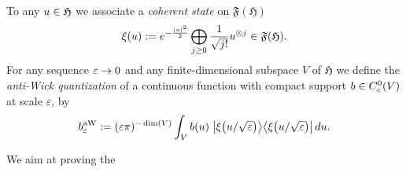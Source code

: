 \documentclass[AHL,Unicode,longabstracts,published]{cedram}
\newcommand{\gH}{\mathfrak{H}}
\newcommand{\gF}{\mathfrak{F}}
\newcommand{\1}{\mathds{1}}
\newcommand{\eps}{\varepsilon}
\let\oldin\in
\renewcommand{\in}{\mathchoice{\oldin}{\oldin}{\,\oldin\,}{\,\oldin\,}}
\renewcommand*{\to}{\mathchoice{\longrightarrow}{\rightarrow}{\rightarrow}{\rightarrow}}
\let\originalleft\left
\let\originalright\right
\renewcommand{\left}{\mathopen{}\mathclose\bgroup\originalleft}
\renewcommand{\right}{\aftergroup\egroup\originalright}
\begin{document}
\begin{defi}\label{def:a-Wick}
To any $u\in \gH$ we associate a \emph{coherent state} on $\gF(\gH)$
\begin{equation}
\xi(u):=e^{-\frac{|u|^2}{2}} \bigoplus_{j \ge 0} \frac{1}{\sqrt{j!}} u^{\otimes j}\in\gF(\gH).\label{eq:def_coherent}
\end{equation}
For any sequence $\eps\to0$ and any finite-dimensional subspace $V$ of $\gH$ we define the \emph{anti-Wick quantization} of a continuous function with compact support $b\in C^0_c(V)$ at scale $\eps$, by
\begin{equation}\label{eq:def_quantization_b}
b^{\rm aW}_{\eps}:=(\eps\pi)^{-\dim(V)}\int_{V} b(u)\;\left|\xi\left(u/\sqrt{\eps}\right)\right\rangle\left\langle\xi\left(u/\sqrt{\eps}\right)\right|\, du.
\end{equation}
\end{defi}

We aim at proving the
\end{document}
